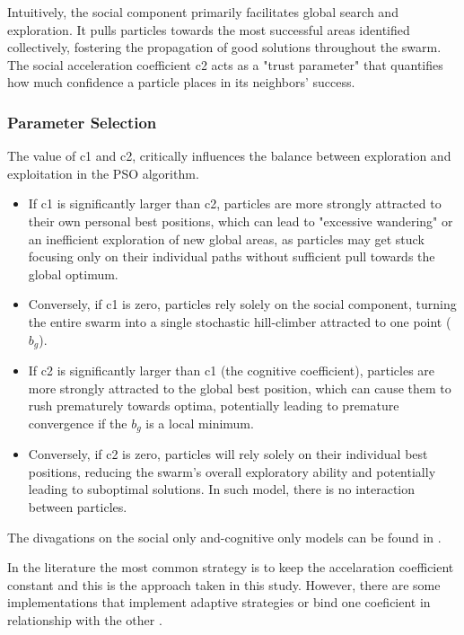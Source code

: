 {Intuitively, the social component primarily facilitates global search and exploration. It pulls particles towards the most successful areas identified collectively, fostering the propagation of good solutions throughout the swarm. The social acceleration coefficient c2 acts as a "trust parameter" that quantifies how much confidence a particle places in its neighbors' success.

\subsubsection{Parameter Selection}

The value of c1 and c2, critically influences the balance between exploration and exploitation in the PSO algorithm.
\begin{itemize}
    \item If c1 is significantly larger than c2, particles are more strongly attracted to their own personal best positions, which can lead to "excessive wandering" or an inefficient exploration of new global areas, as particles may get stuck focusing only on their individual paths without sufficient pull towards the global optimum.
    \item Conversely, if c1 is zero, particles rely solely on the social component, turning the entire swarm into a single stochastic hill-climber attracted to one point ($b_g$).
    \item If c2 is significantly larger than c1 (the cognitive coefficient), particles are more strongly attracted to the global best position, which can cause them to rush prematurely towards optima, potentially leading to premature convergence if the $b_g$ is a local minimum.
    \item Conversely, if c2 is zero, particles will rely solely on their individual best positions, reducing the swarm's overall exploratory ability and potentially leading to suboptimal solutions. In such model, there is no interaction between particles.
\end{itemize}

The divagations on the social only and-cognitive only models can be found in \citep[][]{}.

In the literature the most common strategy is to keep the accelaration coefficient constant and this is the approach taken in this study. However, there are some implementations that implement adaptive strategies \citep[e.g.,][]{} or bind one coeficient in relationship with the other \citep[e.g.,][]{}.

}
